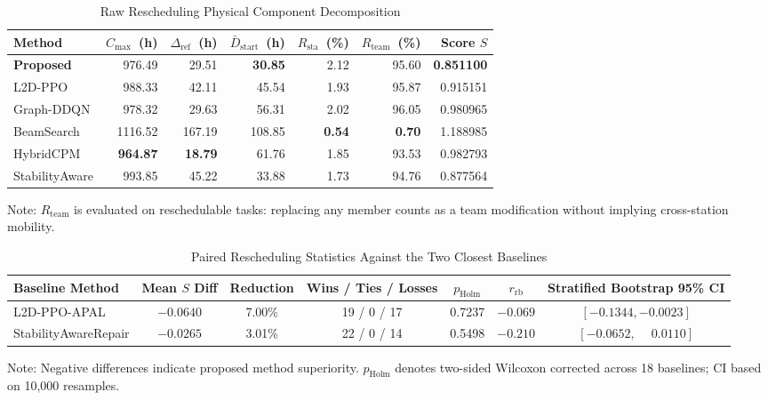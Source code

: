 \documentclass[journal,10pt]{IEEEtran}
\renewcommand{\arraystretch}{0.98}
\begin{document}
\begin{table}[!t]
\centering
\caption{Raw Rescheduling Physical Component Decomposition}
\label{tab:raw_components}
\setlength{\tabcolsep}{3pt}
\renewcommand{\arraystretch}{0.98}
\begin{adjustbox}{max width=\columnwidth}
\begin{tabular}{@{}lrrrrrr@{}}
\toprule
\textbf{Method} & $C_{\max}$~(h) & $\Delta_{\mathrm{ref}}$~(h) & $\bar D_{\mathrm{start}}$~(h) & $R_{\mathrm{sta}}$~(\%) & $R_{\mathrm{team}}$~(\%) & \textbf{Score} $S$ \\
\midrule
\textbf{Proposed} & 976.49 & 29.51 & \textbf{30.85} & 2.12 & 95.60 & \textbf{0.851100} \\
L2D-PPO & 988.33 & 42.11 & 45.54 & 1.93 & 95.87 & 0.915151 \\
Graph-DDQN & 978.32 & 29.63 & 56.31 & 2.02 & 96.05 & 0.980965 \\
BeamSearch & 1116.52 & 167.19 & 108.85 & \textbf{0.54} & \textbf{0.70} & 1.188985 \\
HybridCPM & \textbf{964.87} & \textbf{18.79} & 61.76 & 1.85 & 93.53 & 0.982793 \\
StabilityAware & 993.85 & 45.22 & 33.88 & 1.73 & 94.76 & 0.877564 \\
\bottomrule
\end{tabular}
\end{adjustbox}
\par\smallskip
{\footnotesize Note: $R_{\mathrm{team}}$ is evaluated on reschedulable tasks: replacing any member counts as a team modification without implying cross-station mobility.}
\end{table}

\begin{table}[!t]
\centering
\caption{Paired Rescheduling Statistics Against the Two Closest Baselines}
\label{tab:paired_stats}
\setlength{\tabcolsep}{2.5pt}
\renewcommand{\arraystretch}{0.98}
\begin{adjustbox}{max width=\columnwidth}
\begin{tabular}{@{}lcccccc@{}}
\toprule
\textbf{Baseline Method} & \textbf{Mean $S$ Diff} & \textbf{Reduction} & \textbf{Wins / Ties / Losses} & $p_{\mathrm{Holm}}$ & $r_{\mathrm{rb}}$ & \textbf{Stratified Bootstrap 95\% CI} \\
\midrule
L2D-PPO-APAL & $-0.0640$ & 7.00\% & 19 / 0 / 17 & 0.7237 & $-0.069$ & $[-0.1344, -0.0023]$ \\
StabilityAwareRepair & $-0.0265$ & 3.01\% & 22 / 0 / 14 & 0.5498 & $-0.210$ & $[-0.0652, \phantom{-}0.0110]$ \\
\bottomrule
\end{tabular}
\end{adjustbox}
\par\smallskip
{\footnotesize Note: Negative differences indicate proposed method superiority. $p_{\mathrm{Holm}}$ denotes two-sided Wilcoxon corrected across 18 baselines; CI based on 10,000 resamples.}
\end{table}
\end{document}
